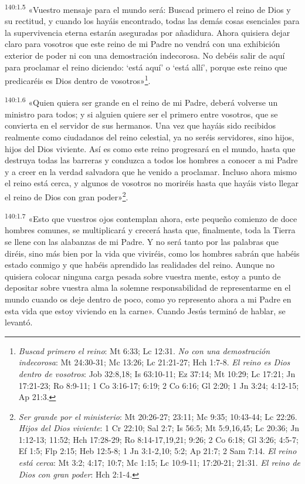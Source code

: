 \par
\textsuperscript{140:1.5} «Vuestro mensaje para el mundo será: Buscad primero el reino de Dios y su rectitud, y cuando los hayáis encontrado, todas las demás cosas esenciales para la supervivencia eterna estarán aseguradas por añadidura. Ahora quisiera dejar claro para vosotros que este reino de mi Padre no vendrá con una exhibición exterior de poder ni con una demostración indecorosa. No debéis salir de aquí para proclamar el reino diciendo: `está aquí' o `está allí', porque este reino que predicaréis es Dios dentro de vosotros»\footnote{\textit{Buscad primero el reino}: Mt 6:33; Lc 12:31. \textit{No con una demostración indecorosa}: Mt 24:30-31; Mc 13:26; Lc 21:21-27; Hch 1:7-8. \textit{El reino es Dios dentro de vosotros}: Job 32:8,18; Is 63:10-11; Ez 37:14; Mt 10:29; Lc 17:21; Jn 17:21-23; Ro 8:9-11; 1 Co 3:16-17; 6:19; 2 Co 6:16; Gl 2:20; 1 Jn 3:24; 4:12-15; Ap 21:3.}.

\par
\textsuperscript{140:1.6} «Quien quiera ser grande en el reino de mi Padre, deberá volverse un ministro para todos; y si alguien quiere ser el primero entre vosotros, que se convierta en el servidor de sus hermanos. Una vez que hayáis sido recibidos realmente como ciudadanos del reino celestial, ya no seréis servidores, sino hijos, hijos del Dios viviente. Así es como este reino progresará en el mundo, hasta que destruya todas las barreras y conduzca a todos los hombres a conocer a mi Padre y a creer en la verdad salvadora que he venido a proclamar. Incluso ahora mismo el reino está cerca, y algunos de vosotros no moriréis hasta que hayáis visto llegar el reino de Dios con gran poder»\footnote{\textit{Ser grande por el ministerio}: Mt 20:26-27; 23:11; Mc 9:35; 10:43-44; Lc 22:26. \textit{Hijos del Dios viviente}: 1 Cr 22:10; Sal 2:7; Is 56:5; Mt 5:9,16,45; Lc 20:36; Jn 1:12-13; 11:52; Hch 17:28-29; Ro 8:14-17,19,21; 9:26; 2 Co 6:18; Gl 3:26; 4:5-7; Ef 1:5; Flp 2:15; Heb 12:5-8; 1 Jn 3:1-2,10; 5:2; Ap 21:7; 2 Sam 7:14. \textit{El reino está cerca}: Mt 3:2; 4:17; 10:7; Mc 1:15; Lc 10:9-11; 17:20-21; 21:31. \textit{El reino de Dios con gran poder}: Hch 2:1-4.}.

\par
\textsuperscript{140:1.7} «Esto que vuestros ojos contemplan ahora, este pequeño comienzo de doce hombres comunes, se multiplicará y crecerá hasta que, finalmente, toda la Tierra se llene con las alabanzas de mi Padre. Y no será tanto por las palabras que diréis, sino más bien por la vida que viviréis, como los hombres sabrán que habéis estado conmigo y que habéis aprendido las realidades del reino. Aunque no quisiera colocar ninguna carga pesada sobre vuestra mente, estoy a punto de depositar sobre vuestra alma la solemne responsabilidad de representarme en el mundo cuando os deje dentro de poco, como yo represento ahora a mi Padre en esta vida que estoy viviendo en la carne». Cuando Jesús terminó de hablar, se levantó.

